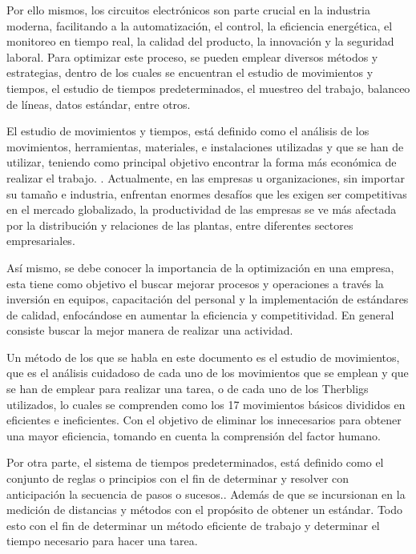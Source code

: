     
    Por ello mismos, los circuitos electrónicos son parte crucial en la industria moderna, facilitando a la automatización, el control, la eficiencia energética, el monitoreo en tiempo real, la calidad del producto, la innovación y la seguridad laboral. Para optimizar este proceso, se pueden emplear diversos métodos y estrategias, dentro de los cuales se encuentran el estudio de movimientos y tiempos, el estudio de tiempos predeterminados, el muestreo del trabajo, balanceo de líneas, datos estándar, entre otros.
    
    
    El estudio de movimientos y tiempos, está definido como el análisis de los movimientos, herramientas, materiales, e instalaciones utilizadas y que se han de utilizar, teniendo como principal objetivo encontrar la forma más económica de realizar el trabajo. \cite{RAE}. Actualmente, en las empresas u organizaciones, sin importar su tamaño e industria, enfrentan enormes desafíos que les exigen ser competitivas en el mercado globalizado, la productividad de las empresas se ve más afectada por la distribución y relaciones de las plantas, entre diferentes sectores empresariales.
    
    
    Así mismo, se debe conocer la importancia de la optimización en una empresa, esta tiene como objetivo el buscar mejorar procesos y operaciones a través la inversión en equipos, capacitación del personal y la implementación de estándares de calidad, enfocándose en aumentar la eficiencia y competitividad. En general consiste buscar la mejor manera de realizar una actividad. \cite{RAE}
    
    
    Un método de los que se habla en este documento es el estudio de movimientos, que es el análisis cuidadoso de cada uno de los movimientos que se emplean y que se han de emplear para realizar una tarea, o de cada uno de los Therbligs utilizados, lo cuales se comprenden como los 17 movimientos básicos divididos en eficientes e ineficientes. Con el objetivo de eliminar los innecesarios para obtener una mayor eficiencia, tomando en cuenta la comprensión del factor humano. \cite{niebel1980ingenieria} 
    
    
    
    Por otra parte, el sistema de tiempos predeterminados, está definido como el conjunto de reglas o principios con el fin de determinar y resolver con anticipación la secuencia de pasos o sucesos.\cite{RAE}. Además de que se incursionan en la medición de distancias y métodos con el propósito de obtener un estándar. Todo esto con el fin de determinar un método eficiente de trabajo y determinar el tiempo necesario para hacer una tarea. 
    

